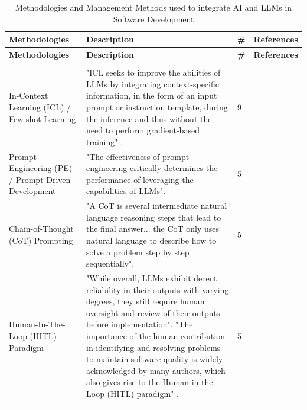 {\small
\begin{longtable}{>{\raggedright\arraybackslash} p{3cm} p{9.3cm} p{0.2cm} p{1.8cm}}
\caption{Methodologies and Management Methods used to integrate AI and LLMs in Software Development} \\

\toprule
\textbf{Methodologies} & \textbf{Description} & \textbf{\#} & \textbf{References}\\
\midrule
\endfirsthead

\toprule
\textbf{Methodologies} & \textbf{Description} & \textbf{\#} & \textbf{References}\\
\midrule
\endhead

\midrule
\multicolumn{4}{r}{\textit{Continued on next page}}\\
\bottomrule
\endfoot

\bottomrule
\endlastfoot

In-Context Learning (ICL) / Few-shot Learning & "ICL seeks to improve the abilities of LLMs by integrating context-specific information, in the form of an input prompt or instruction template, during the inference and thus without the need to perform gradient-based training" \cite{Weyssow:2025ep}. & 9 & \cite{Weyssow:2025ep, Terragni:2025fa, Chen:2025es, Ramos:2025aa, Durrani:2024ad, Gao:2025cc, Hemmat:2025rd, Qiu:2025ft, Jabrw:2025ss} \\ \addlinespace

Prompt Engineering (PE) / Prompt-Driven Development & "The effectiveness of prompt engineering critically determines the performance of leveraging the capabilities of LLMs". \cite{Jabrw:2025ss} & 5 &  \cite{Jabrw:2025ss, Pendyala:2025pi, Qiu:2025ft, Ahmed:2025ai, Chen:2025es} \\ \addlinespace

Chain-of-Thought (CoT) Prompting & "A CoT is several intermediate natural language reasoning steps that lead to the final answer... the CoT only uses natural language to describe how to solve a problem step by step sequentially". \cite{Li:2025sc} & 5 & \cite{Li:2025sc, Jabrw:2025ss, Chen:2025es, Ahmed:2025ai , Gao:2025cc} \\ \addlinespace

Human-In-The-Loop (HITL) Paradigm & "While overall, LLMs exhibit decent reliability in their outputs with varying degrees, they still require human oversight and review of their outputs before implementation". "The importance of the human contribution in identifying and resolving problems to maintain software quality is widely acknowledged by many authors, which also gives rise to the Human-in-the-Loop (HITL) paradigm" \cite{Kim:2025ao}. & 5 & \cite{Kim:2025ao, Wang:2025rs, Terragni:2025fa, Hemmat:2025rd, Haque:2025la}\\ \addlinespace


\end{longtable}}
